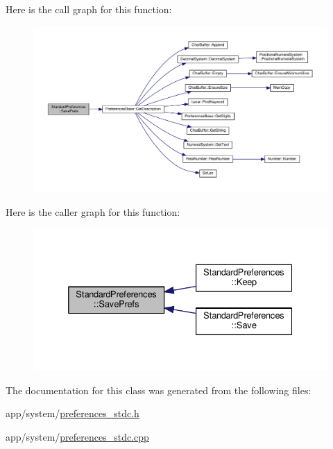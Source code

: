 Here is the call graph for this function\+:\nopagebreak
\begin{figure}[H]
\begin{center}
\leavevmode
\includegraphics[width=350pt]{classStandardPreferences_af4d99d40f18776348f76fc0b9f5cdda4_cgraph}
\end{center}
\end{figure}




Here is the caller graph for this function\+:\nopagebreak
\begin{figure}[H]
\begin{center}
\leavevmode
\includegraphics[width=332pt]{classStandardPreferences_af4d99d40f18776348f76fc0b9f5cdda4_icgraph}
\end{center}
\end{figure}




The documentation for this class was generated from the following files\+:\begin{DoxyCompactItemize}
\item 
app/system/\hyperlink{preferences__stdc_8h}{preferences\+\_\+stdc.\+h}\item 
app/system/\hyperlink{preferences__stdc_8cpp}{preferences\+\_\+stdc.\+cpp}\end{DoxyCompactItemize}
